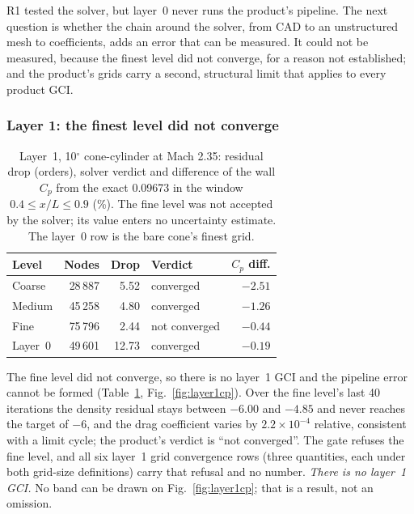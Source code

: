 \documentclass[twocolumn]{labreport}
\newcommand{\Cp}{C_p}
\begin{document}
R1 tested the solver, but layer~0 never runs the product's pipeline.
The next question is whether the chain around the solver, from CAD to an unstructured mesh to coefficients, adds an error that can be measured.
It could not be measured, because the finest level did not converge, for a reason not established; and the product's grids carry a second, structural limit that applies to every product GCI.

\subsubsection{Layer 1: the finest level did not converge}
\label{sec:layer1}

\begin{table}[t]
\centering
\caption{Layer~1, 10$^\circ$ cone-cylinder at Mach 2.35: residual drop (orders), solver verdict and difference of the wall $\Cp$ from the exact 0.09673 in the window $0.4\le x/L\le0.9$ (\%). The fine level was not accepted by the solver; its value enters no uncertainty estimate. The layer~0 row is the bare cone's finest grid.}
\label{tab:layer1}
\small
\setlength{\tabcolsep}{3pt}
\begin{tabular}{@{}lrrlr@{}}
\toprule
Level & Nodes & Drop & Verdict & $\Cp$ diff. \\
\midrule
Coarse & 28\,887 & 5.52 & converged & $-2.51$ \\
Medium & 45\,258 & 4.80 & converged & $-1.26$ \\
Fine & 75\,796 & 2.44 & not converged & $-0.44$ \\
\midrule
Layer~0 & 49\,601 & 12.73 & converged & $-0.19$ \\
\bottomrule
\end{tabular}
\end{table}

The fine level did not converge, so there is no layer~1 GCI and the pipeline error cannot be formed (Table~\ref{tab:layer1}, Fig.~\ref{fig:layer1cp}).
Over the fine level's last 40 iterations the density residual stays between $-6.00$ and $-4.85$ and never reaches the target of $-6$, and the drag coefficient varies by $2.2\times10^{-4}$ relative, consistent with a limit cycle; the product's verdict is ``not converged''.
The gate refuses the fine level, and all six layer~1 grid convergence rows (three quantities, each under both grid-size definitions) carry that refusal and no number.
\emph{There is no layer~1 GCI.}
No band can be drawn on Fig.~\ref{fig:layer1cp}; that is a result, not an omission.
\end{document}
